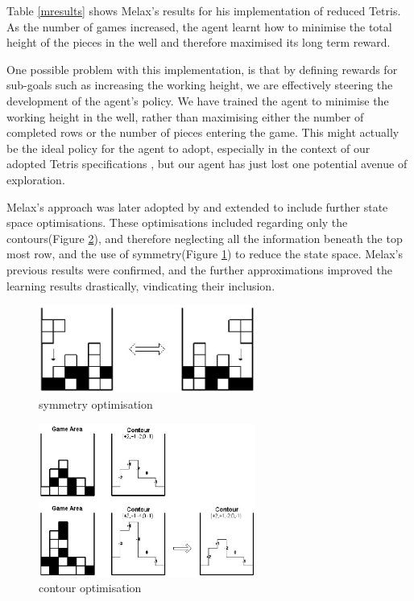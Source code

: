 \documentclass[a4paper]{article}%
\begin{document}
Table \ref{mresults} shows Melax's results for his implementation of reduced Tetris. As the number of games increased, the agent learnt how to minimise the total height of the pieces in the well and therefore maximised its long term reward.

One possible problem with this implementation, is that by defining rewards for sub-goals such as increasing the working height, we are effectively steering the development of the agent's policy. We have trained the agent to minimise the working height in the well, rather than maximising either the number of completed rows or the number of pieces entering the game. This might actually be the ideal policy for the agent to adopt, especially in the context of our adopted Tetris specifications \citep{tetstand}, but our agent has just lost one potential avenue of exploration.  

Melax's approach was later adopted by \cite{yaeltetris} and extended to include further state space optimisations. These optimisations included regarding only the contours(Figure \ref{fig:contop}), and therefore neglecting all the information beneath the top most row, and the use of symmetry(Figure \ref{fig:symop}) to reduce the state space.  Melax's \citep{melaxtetris} previous results were confirmed, and the further approximations improved the learning results drastically, vindicating their inclusion\citep{yaeltetris}. 

\begin{figure}[h]
\centering
\includegraphics[width=2.8in]{Symetry.jpg}
\caption{\cite{yaeltetris} symmetry optimisation}
\label{fig:symop}
\end{figure}

\begin{figure}[h]
\centering
\includegraphics[width=2.8in]{contour.jpg}
\caption{\cite{yaeltetris}contour optimisation}
\label{fig:contop}
\end{figure}
\end{document}
